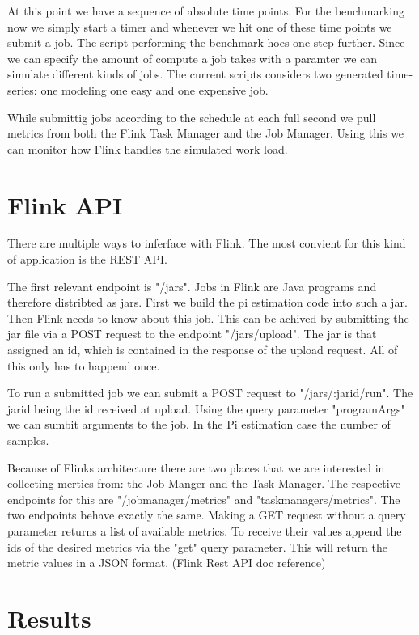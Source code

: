At this point we have a sequence of absolute time points. For the benchmarking now we simply start a timer and whenever we hit one of these time points we submit a job. The script performing the benchmark hoes one step further. Since we can specify the amount of compute a job takes with a paramter we can simulate different kinds of jobs. The current scripts considers two generated time-series: one modeling one easy and one expensive job. 

While submittig jobs according to the schedule at each full second we pull metrics from both the Flink Task Manager and the Job Manager. Using this we can monitor how Flink handles the simulated work load.

\section{Flink API}

There are multiple ways to inferface with Flink. The most convient for this kind of application is the REST API. 

The first relevant endpoint is "/jars". Jobs in Flink are Java programs and therefore distribted as jars. First we build the pi estimation code into such a jar. Then Flink needs to know about this job. This can be achived by submitting the jar file via a POST request to the endpoint "/jars/upload". The jar is that assigned an id, which is contained in the response of the upload request. All of this only has to happend once. 

To run a submitted job we can submit a POST request to "/jars/:jarid/run". The jarid being the id received at upload. Using the query parameter "programArgs" we can sumbit arguments to the job. In the Pi estimation case the number of samples. 

Because of Flinks architecture there are two places that we are interested in collecting mertics from: the Job Manger and the Task Manager. The respective endpoints for this are "/jobmanager/metrics" and "taskmanagers/metrics". The two endpoints behave exactly the same. Making a GET request without a query parameter returns a list of available metrics. To receive their values append the ids of the desired metrics via the "get" query parameter. This will return the metric values in a JSON format. (Flink Rest API doc reference)

\section{Results}




